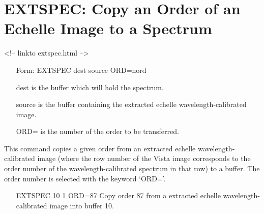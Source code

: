 \section{EXTSPEC: Copy an Order of an Echelle Image to a Spectrum}
\begin{rawhtml}
<!-- linkto extspec.html -->
\end{rawhtml}
\begin{itemize}
  \item[Form: EXTSPEC dest source ORD=nord\hfill]{}
  \item[dest]{is the buffer which will hold the spectrum.}
  \item[source]{is the buffer containing the extracted
       echelle wavelength-calibrated image.}
  \item[ORD=]{is the number of the order to be transferred.}
\end{itemize}

This command copies a given order from an extracted echelle
wavelength-calibrated image (where the row number of the Vista image
corresponds to the order number of the wavelength-calibrated spectrum in
that row) to a buffer. The order number is selected with the keyword
`ORD='.

\begin{itemize}
  \item[EXTSPEC 10 1 ORD=87\hfill]{ Copy order 87 from a extracted echelle
       wavelength-calibrated image into buffer 10.}
\end{itemize}
